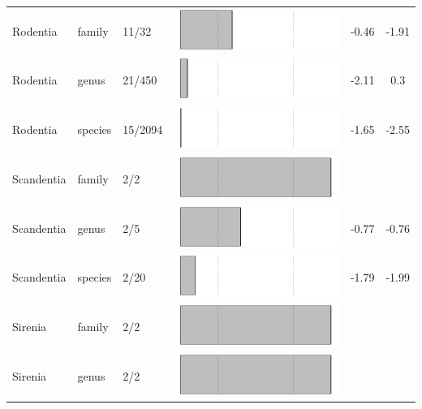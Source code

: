 \begin{longtable}{lL{1.8cm}C{2cm}lcc}
  Rodentia & family & 11/32 & \includegraphics[width=0.20\linewidth, height=0.05\linewidth]{Missing_mammals/Table_figures/bar70.pdf} & -0.46 & -1.91 \\ 
  Rodentia & genus & 21/450 & \includegraphics[width=0.20\linewidth, height=0.05\linewidth]{Missing_mammals/Table_figures/bar71.pdf} & -2.11 & 0.3 \\ 
  Rodentia & species & 15/2094 & \includegraphics[width=0.20\linewidth, height=0.05\linewidth]{Missing_mammals/Table_figures/bar72.pdf} & -1.65 & -2.55 \\ 
  Scandentia & family & 2/2 & \includegraphics[width=0.20\linewidth, height=0.05\linewidth]{Missing_mammals/Table_figures/bar73.pdf} &   &   \\ 
  Scandentia & genus & 2/5 & \includegraphics[width=0.20\linewidth, height=0.05\linewidth]{Missing_mammals/Table_figures/bar74.pdf} & -0.77 & -0.76 \\ 
  Scandentia & species & 2/20 & \includegraphics[width=0.20\linewidth, height=0.05\linewidth]{Missing_mammals/Table_figures/bar75.pdf} & -1.79 & -1.99 \\ 
  Sirenia & family & 2/2 & \includegraphics[width=0.20\linewidth, height=0.05\linewidth]{Missing_mammals/Table_figures/bar76.pdf} &   &   \\ 
  Sirenia & genus & 2/2 & \includegraphics[width=0.20\linewidth, height=0.05\linewidth]{Missing_mammals/Table_figures/bar77.pdf} &   &   \\ 

\end{longtable}
